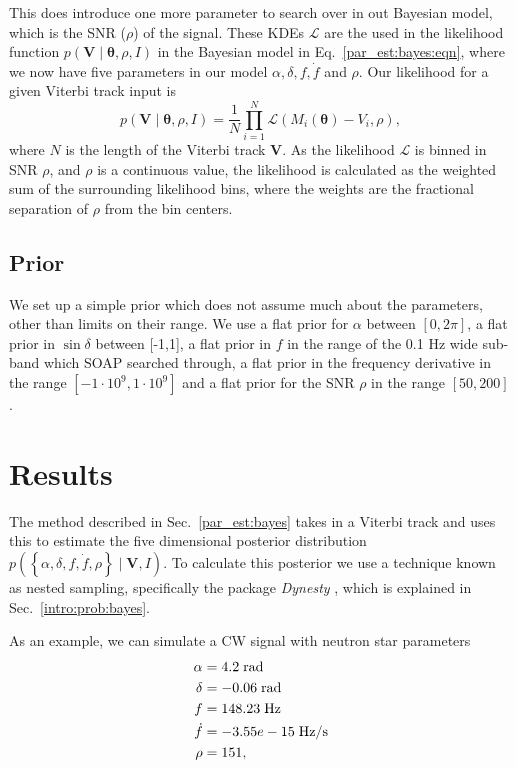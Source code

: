 This does introduce one more parameter to search over in out Bayesian model, which is the \gls{SNR} ($\rho$) of the signal.
These \glspl{KDE} $\mathcal{L}$ are the used in the likelihood function $p(\bm{V} \mid \bm{\theta}, \rho, I)$ in the Bayesian model in Eq.~\ref{par_est:bayes:eqn}, where we now have five parameters in our model $\alpha, \delta, f, \dot{f}$ and $\rho$.
Our likelihood for a given Viterbi track input is
\begin{equation}
    p(\bm{V} \mid \bm{\theta}, \rho, I) = \frac{1}{N}\prod_{i = 1}^{N} \mathcal{L}(M_i(\bm{\theta}) - V_i, \rho) ,
\end{equation}
where $N$ is the length of the Viterbi track $\bm{V}$. 
As the likelihood $\mathcal{L}$ is binned in \gls{SNR} $\rho$, and $\rho$ is a continuous value, the likelihood is calculated as the weighted sum of the surrounding likelihood bins, where the weights are the fractional separation of $\rho$ from the bin centers. 

%
\subsection{Prior}
%
We set up a simple prior which does not assume much about the parameters, other than limits on their range. 
We use a flat prior for $\alpha$ between $[0,2\pi]$, a flat prior in $\sin{\delta}$ between [-1,1], a flat prior in $f$ in the range of the 0.1 Hz wide sub-band which SOAP searched through, a flat prior in the frequency derivative in the range $[-1\cdot 10^{9},1\cdot 10^{9}]$ and a flat prior for the \gls{SNR} $\rho$ in the range $[50,200]$.


\clearpage

\section{\label{par_est:results}Results}

The method described in Sec.~\ref{par_est:bayes} takes in a Viterbi track and uses this to estimate the five dimensional posterior distribution $p\left(\left\{ \alpha, \delta, f, \dot{f}, \rho \right\} \mid \bm{V}, I \right)$.
To calculate this posterior we use a technique known as nested sampling, specifically the package {\it Dynesty} \citep{speagle2019DynestyDynamic}, which is explained in Sec.~\ref{intro:prob:bayes}. 

As an example, we can simulate a \gls{CW} signal with neutron star parameters 
\begin{equation}
    \label{par_est:results:examplepars}
    \begin{split}
        \alpha &= 4.2 \; \rm{rad}\\
        \delta &= -0.06 \; \rm{rad} \\
        f &= 148.23 \; \rm{Hz}\\
        \dot{f} &= -3.55e-15 \; \rm{Hz/s}\\
        \rho &= 151,\\
    \end{split}
\end{equation}

